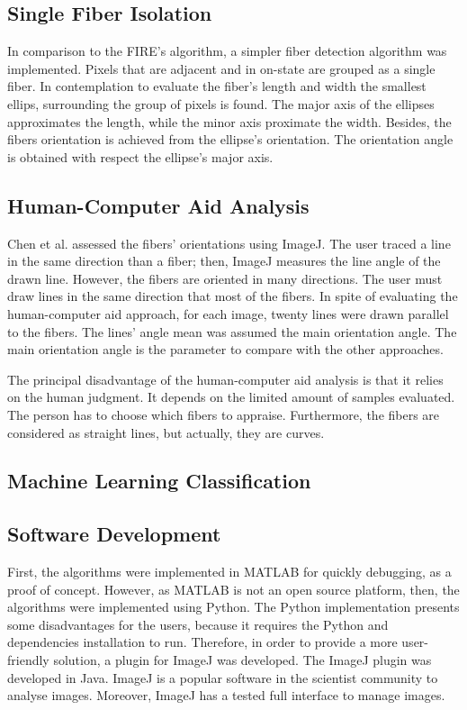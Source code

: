 \documentclass[12pt,a4paper]{article}
\begin{document}
\subsection{Single Fiber Isolation}

In comparison to the FIRE’s algorithm, a simpler fiber detection algorithm was implemented. Pixels that are adjacent and in on-state are grouped as a single fiber. In contemplation to evaluate the fiber’s length and width the smallest ellips, surrounding the group of pixels is found. The major axis of the ellipses approximates the length, while the minor axis proximate the width. Besides, the fibers orientation is achieved from the ellipse's orientation. The orientation angle is obtained with respect the ellipse’s major axis.
\subsection{Human-Computer Aid Analysis}

Chen et al. assessed the fibers' orientations using ImageJ. The user traced a line in the same direction than a fiber; then, ImageJ measures the line angle of the drawn line. However, the fibers are oriented in many directions. The user must draw lines in the same direction that most of the fibers. In spite of evaluating the human-computer aid approach, for each image, twenty lines were drawn parallel to the fibers. The lines' angle mean was assumed the main orientation angle. The main orientation angle is the parameter to compare with the other approaches.

The principal disadvantage of the human-computer aid analysis is that it relies on the human judgment. It depends on the limited amount of samples evaluated. The person has to choose which fibers to appraise. Furthermore, the fibers are considered as straight lines, but actually, they are curves.

\subsection{Machine Learning Classification}


\subsection{Software Development}
First, the algorithms were implemented in MATLAB for quickly debugging, as a proof of concept. However, as MATLAB is not an open source platform, then, the algorithms were implemented using Python. The Python implementation presents some disadvantages for the users, because it requires the Python and dependencies installation to run. Therefore, in order to provide a more user-friendly solution, a plugin for ImageJ was developed. The ImageJ plugin was developed in Java. ImageJ is a popular software in the scientist community to analyse images. Moreover, ImageJ has a tested full interface to manage images.
\end{document}
